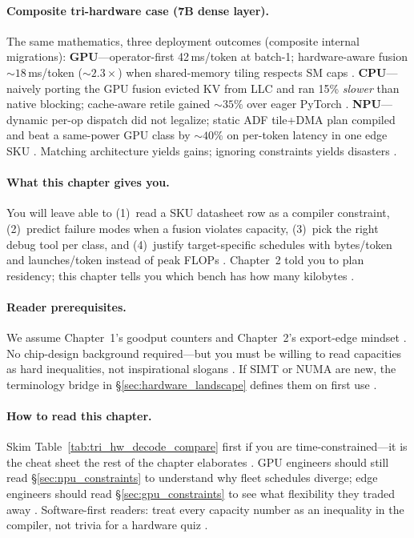 \paragraph{Composite tri-hardware case (7B dense layer).}
The same mathematics, three deployment outcomes (composite internal migrations):
\textbf{GPU}---operator-first 42\,ms/token at batch-1; hardware-aware fusion ${\sim}18$\,ms/token (${\sim}2.3\times$) when shared-memory tiling respects SM caps \citep{memoryfloor2026,taxbreak2026}.
\textbf{CPU}---naively porting the GPU fusion evicted KV from LLC and ran 15\% \emph{slower} than native blocking; cache-aware retile gained ${\sim}35\%$ over eager PyTorch \citep{patel2025llminference,rotem2018glow}.
\textbf{NPU}---dynamic per-op dispatch did not legalize; static ADF tile+DMA plan compiled and beat a same-power GPU class by ${\sim}40\%$ on per-token latency in one edge SKU \citep{amd2024xdna,amd2024aie}.
Matching architecture yields gains; ignoring constraints yields disasters \citep{yirage2026}.

\paragraph{What this chapter gives you.}
You will leave able to (1)~read a SKU datasheet row as a compiler constraint, (2)~predict failure modes when a fusion violates capacity, (3)~pick the right debug tool per class, and (4)~justify target-specific schedules with bytes/token and launches/token instead of peak FLOPs \citep{taxbreak2026,memoryfloor2026,patel2025llminference}.
Chapter~2 told you to plan residency; this chapter tells you which bench has how many kilobytes \citep{yirage2026,nvidia2022hopper,amd2024xdna}.

\paragraph{Reader prerequisites.}
We assume Chapter~1's goodput counters and Chapter~2's export-edge mindset \citep{taxbreak2026,memoryfloor2026,chen2020compilerbasedhardw}.
No chip-design background required---but you must be willing to read capacities as hard inequalities, not inspirational slogans \citep{patel2025llminference}.
If SIMT or NUMA are new, the terminology bridge in \S\ref{sec:hardware_landscape} defines them on first use \citep{nvidia2022hopper,dlbook}.

\paragraph{How to read this chapter.}
Skim Table~\ref{tab:tri_hw_decode_compare} first if you are time-constrained---it is the cheat sheet the rest of the chapter elaborates \citep{patel2025llminference}.
GPU engineers should still read \S\ref{sec:npu_constraints} to understand why fleet schedules diverge; edge engineers should read \S\ref{sec:gpu_constraints} to see what flexibility they traded away \citep{amd2024xdna,nvidia2022hopper}.
Software-first readers: treat every capacity number as an inequality in the compiler, not trivia for a hardware quiz \citep{yirage2026,chen2020compilerbasedhardw}.

